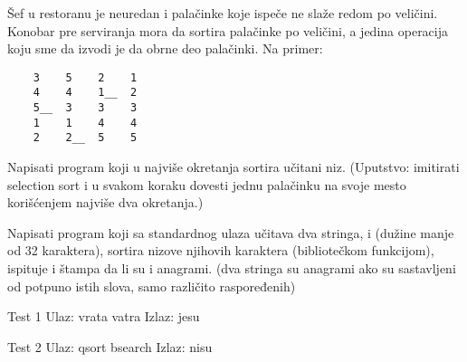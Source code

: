 \begin{Exercise}[label=512]
  Šef u restoranu je neuredan i palačinke koje ispeče ne slaže redom
  po veličini. Konobar pre serviranja mora da sortira palačinke po
  veličini, a jedina operacija koju sme da izvodi je da obrne deo
  palačinki. Na primer:
\begin{verbatim}
    3    5    2    1
    4    4    1__  2
    5__  3    3    3
    1    1    4    4
    2    2__  5    5
\end{verbatim}
Napisati program koji u najviše  okretanja sortira učitani
niz. (Uputstvo: imitirati selection sort i u svakom koraku dovesti
jednu palačinku na svoje mesto korišćenjem najviše dva okretanja.)
    
\end{Exercise}

\begin{Exercise}[label=513]
  Napisati program koji sa standardnog ulaza učitava dva stringa,
   i  (dužine manje od 32 karaktera), sortira nizove
  njihovih karaktera (bibliotečkom  funkcijom), ispituje
  i štampa da li su  i  anagrami. (dva stringa su
  anagrami ako su sastavljeni od potpuno istih slova, samo različito
  raspoređenih)
  
\begin{minitest}
\begin{test}{Test 1}
Ulaz:   vrata vatra
Izlaz:  jesu
\end{test}
\end{minitest}
\begin{miditest}
\begin{test}{Test 2}
Ulaz:   qsort bsearch
Izlaz:  nisu
\end{test}
\end{miditest}
  
\end{Exercise}

